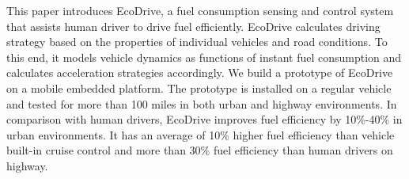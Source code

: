This paper introduces EcoDrive, a fuel consumption sensing and control
system that assists human driver to drive fuel efficiently. 
EcoDrive calculates driving strategy based on the properties of individual vehicles 
and road conditions. 
To this end, it models vehicle dynamics as functions of instant fuel consumption
and calculates acceleration strategies accordingly. 
We build a prototype of EcoDrive on a mobile embedded platform. 
The prototype is installed on a regular vehicle and
tested for more than 100 miles in both urban and highway environments. 
In comparison with human drivers, 
EcoDrive improves fuel efficiency by 10\%-40\% in urban environments. 
It has an average of 10\% higher fuel efficiency than vehicle built-in cruise control
and more than 30\% fuel efficiency than human drivers
on highway.  


